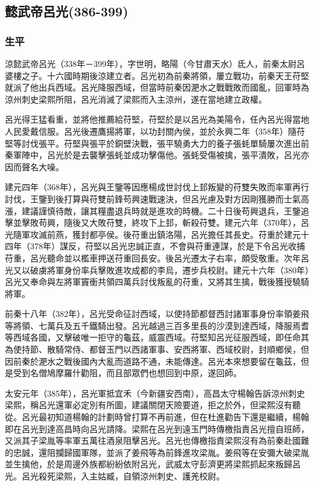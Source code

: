 
\subsection{懿武帝呂光\tiny(386-399)}

\subsubsection{生平}

涼懿武帝呂光（338年－399年），字世明，略陽（今甘肅天水）氐人，前秦太尉呂婆樓之子。十六國時期後涼建立者。呂光初為前秦將領，屢立戰功，前秦天王苻堅就派了他出兵西域。呂光降服西域，但當時前秦因淝水之戰戰敗而國亂，回軍時為涼州刺史梁熙所阻，呂光消滅了梁熙而入主涼州，遂在當地建立政權。

呂光得王猛看重，並將他推薦給苻堅，苻堅於是以呂光為美陽令，任內呂光得當地人民愛戴信服。呂光後遷鷹揚將軍，以功封關內侯，並於永興二年（358年）隨苻堅等討伐張平。苻堅與張平於銅壁決戰，張平驍勇大力的養子張蚝單騎屢次進出前秦軍陣中，呂光於是去襲擊張蚝並成功擊傷他。張蚝受傷被擒，張平潰敗，呂光亦因而聲名大噪。

建元四年（368年），呂光與王鑒等因應楊成世討伐上邽叛變的苻雙失敗而率軍再行討伐，王鑒到後打算與苻雙前鋒苟興速戰速決，但呂光慮及對方因剛獲勝而士氣高漲，建議謹慎待敵，讓其糧盡退兵時就是進攻的時機。二十日後苟興退兵，王鑒追擊並擊敗苟興，隨後又大敗苻雙，終攻下上邽，斬殺苻雙。建元六年（370年），呂光隨軍攻滅前燕，獲封都亭侯。後苻重出鎮洛陽，呂光擔任其長史。苻重於建元十四年（378年）謀反，苻堅以呂光忠誠正直，不會與苻重連謀，於是下令呂光收捕苻重，呂光聽命並以檻車押送苻重回長安。後呂光遷太子右率，頗受敬重。次年呂光又以破虜將軍身份率兵擊敗進攻成都的李烏，遷步兵校尉。建元十六年（380年）呂光又奉命與左將軍竇衝共領四萬兵討伐叛亂的苻重，又將其生擒，戰後獲授驍騎將軍。

前秦十八年（382年），呂光受命征討西域，以使持節都督西討諸軍事身份率領姜飛等將領、七萬兵及五千鐵騎出發。呂光越過三百多里長的沙漠到達西域，降服焉耆等西域各國，又擊破唯一拒守的龜茲，威震西域。苻堅知呂光征服西域，即任命其為使持節、散騎常侍、都督玉門以西諸軍事、安西將軍、西域校尉，封順鄉侯，但因前秦於淝水之戰後國內大亂而道路不通，未能傳達。呂光本來想要留在龜茲，但是受到名僧鳩摩羅什勸阻，而且部眾們也想回到中原，遂回師。

太安元年（385年），呂光軍抵宜禾（今新疆安西南），高昌太守楊翰告訴涼州刺史梁熙，稱呂光還軍必定別有所圖，建議關閉天險要道，拒之於外，但梁熙沒有聽從。呂光最初知道楊翰的計劃時曾打算不再前進，但在杜進勸告下還是繼續，楊翰即在呂光到達高昌時向呂光請降。梁熙在呂光到遠玉門時傳檄指責呂光擅自班師，又派其子梁胤等率軍五萬往酒泉阻擊呂光。呂光也傳檄指責梁熙沒有為前秦赴國難的忠誠，還阻攔歸國軍隊，並派了姜飛等為前鋒進攻梁胤。姜飛等在安彌大破梁胤並生擒他，於是周邊外族都紛紛依附呂光，武威太守彭濟更將梁熙抓起來叛歸呂光。呂光殺死梁熙，入主姑臧，自領涼州刺史、護羌校尉。

